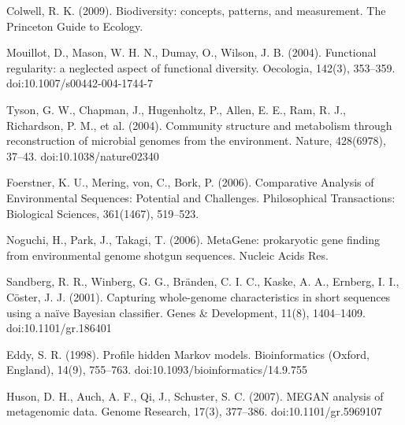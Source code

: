 \documentclass[10pt,letterpaper]{article}
\begin{document}
\nolinenumbers

%
%
% 

\begin{thebibliography}{10}
Colwell, R. K. (2009). Biodiversity: concepts, patterns, and measurement. The Princeton Guide to Ecology.

Mouillot, D., Mason, W. H. N., Dumay, O., Wilson, J. B. (2004). Functional regularity: a neglected aspect of functional diversity. Oecologia, 142(3), 353–359. doi:10.1007/s00442-004-1744-7

Tyson, G. W., Chapman, J., Hugenholtz, P., Allen, E. E., Ram, R. J., Richardson, P. M., et al. (2004). Community structure and metabolism through reconstruction of microbial genomes from the environment. Nature, 428(6978), 37–43. doi:10.1038/nature02340

Foerstner, K. U., Mering, von, C., Bork, P. (2006). Comparative Analysis of Environmental Sequences: Potential and Challenges. Philosophical Transactions: Biological Sciences, 361(1467), 519–523.

Noguchi, H., Park, J., Takagi, T. (2006). MetaGene: prokaryotic gene finding from environmental genome shotgun sequences. Nucleic Acids Res.

Sandberg, R. R., Winberg, G. G., Bränden, C. I. C., Kaske, A. A., Ernberg, I. I., Cöster, J. J. (2001). Capturing whole-genome characteristics in short sequences using a naïve Bayesian classifier. Genes \& Development, 11(8), 1404–1409. doi:10.1101/gr.186401

Eddy, S. R. (1998). Profile hidden Markov models. Bioinformatics (Oxford, England), 14(9), 755–763. doi:10.1093/bioinformatics/14.9.755

Huson, D. H., Auch, A. F., Qi, J., Schuster, S. C. (2007). MEGAN analysis of metagenomic data. Genome Research, 17(3), 377–386. doi:10.1101/gr.5969107


\end{thebibliography}
\end{document}
